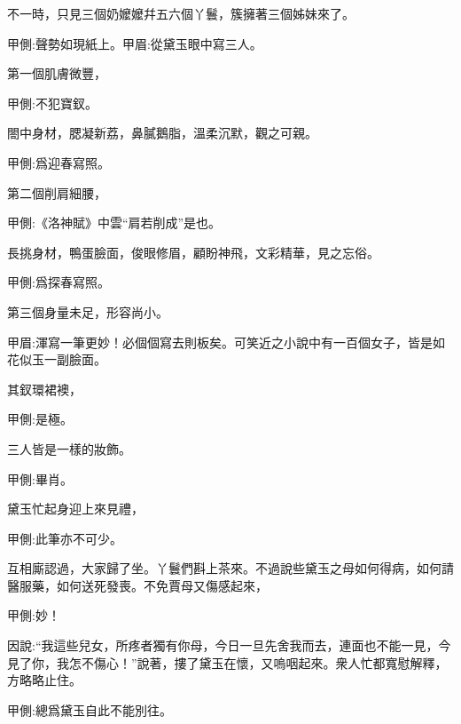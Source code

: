 \begin{parag}
    不一時，只見三個奶嬤嬤幷五六個丫鬟，簇擁著三個姊妹來了。\begin{note}甲側:聲勢如現紙上。甲眉:從黛玉眼中寫三人。\end{note}第一個肌膚微豐，\begin{note}甲側:不犯寶釵。\end{note}閤中身材，腮凝新荔，鼻膩鵝脂，溫柔沉默，觀之可親。\begin{note}甲側:爲迎春寫照。\end{note}第二個削肩細腰，\begin{note}甲側:《洛神賦》中雲“肩若削成”是也。\end{note}長挑身材，鴨蛋臉面，俊眼修眉，顧盼神飛，文彩精華，見之忘俗。\begin{note}甲側:爲探春寫照。\end{note}第三個身量未足，形容尚小。\begin{note}甲眉:渾寫一筆更妙！必個個寫去則板矣。可笑近之小說中有一百個女子，皆是如花似玉一副臉面。\end{note}其釵環裙襖，\begin{note}甲側:是極。\end{note}三人皆是一樣的妝飾。\begin{note}甲側:畢肖。\end{note}黛玉忙起身迎上來見禮，\begin{note}甲側:此筆亦不可少。\end{note}互相廝認過，大家歸了坐。丫鬟們斟上茶來。不過說些黛玉之母如何得病，如何請醫服藥，如何送死發喪。不免賈母又傷感起來，\begin{note}甲側:妙！\end{note}因說:“我這些兒女，所疼者獨有你母，今日一旦先舍我而去，連面也不能一見，今見了你，我怎不傷心！”說著，摟了黛玉在懷，又嗚咽起來。衆人忙都寬慰解釋，方略略止住。\begin{note}甲側:總爲黛玉自此不能別往。\end{note}
\end{parag}


